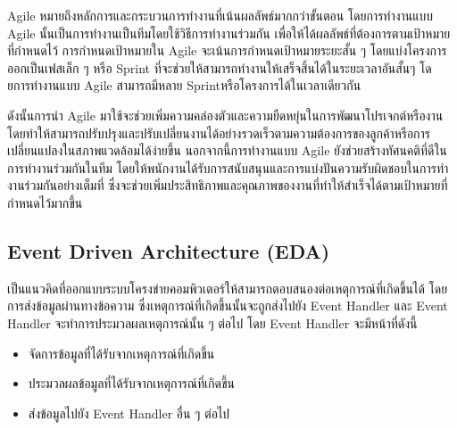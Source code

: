 \documentclass[12pt,oneside,openright,a4paper]{cpe-thai-project}
\begin{document}
  \hspace{1cm}Agile \cite{agile} หมายถึงหลักการและกระบวนการทํางานที่เน้นผลลัพธ์มากกว่าขั้นตอน 
  โดยการทํางานแบบ Agile นั้นเป็นการทํางานเป็นทีมโดยใช้วิธีการทํางานร่วมกัน 
  เพื่อให้ได้ผลลัพธ์ที่ต้องการตามเป้าหมายที่กําหนดไว้ การกําหนดเป้าหมายใน Agile จะเน้นการกําหนดเป้าหมายระยะสั้น ๆ 
  โดยแบ่งโครงการออกเป็นเฟสเล็ก ๆ หรือ Sprint ที่จะช่วยให้สามารถทํางานให้เสร็จสิ้นได้ในระยะเวลาอันสั้นๆ 
  โดยการทํางานแบบ Agile สามารถมีหลาย Sprintหรือโครงการได้ในเวลาเดียวกัน
  
  \hspace{1cm}ดังนั้นการนํา Agile มาใช้จะช่วยเพิ่มความคล่องตัวและความยืดหยุ่นในการพัฒนาโปรเจกต์หรืองาน 
  โดยทําให้สามารถปรับปรุงและปรับเปลี่ยนงานได้อย่างรวดเร็วตามความต้องการของลูกค้าหรือการเปลี่ยนแปลงในสภาพแวดล้อมได้ง่ายขึ้น 
  นอกจากนี้การทํางานแบบ Agile ยังช่วยสร้างทัศนคติที่ดีในการทํางานร่วมกันในทีม 
  โดยให้พนักงานได้รับการสนับสนุนและการแบ่งปันความรับผิดชอบในการทํางานร่วมกันอย่างเต็มที่ 
  ซึ่งจะช่วยเพิ่มประสิทธิภาพและคุณภาพของงานที่ทําให้สําเร็จได้ตามเป้าหมายที่กําหนดไว้มากขึ้น

  \subsection{Event Driven Architecture (EDA)}
    \hspace{1cm}เป็นแนวคิดที่ออกแบบระบบโครงข่ายคอมพิวเตอร์ให้สามารถตอบสนองต่อเหตุการณ์ที่เกิดขึ้นได้ โดยการส่งข้อมูลผ่านทางข้อความ ซึ่งเหตุการณ์ที่เกิดขึ้นนั้นจะถูกส่งไปยัง Event Handler
    และ Event Handler จะทำการประมวลผลเหตุการณ์นั้น ๆ ต่อไป \cite{eda}  โดย Event Handler จะมีหน้าที่ดังนี้ 
    \begin{itemize}
      \item จัดการข้อมูลที่ได้รับจากเหตุการณ์ที่เกิดขึ้น
      \item ประมวลผลข้อมูลที่ได้รับจากเหตุการณ์ที่เกิดขึ้น
      \item ส่งข้อมูลไปยัง Event Handler อื่น ๆ ต่อไป
    \end{itemize}
\end{document}
